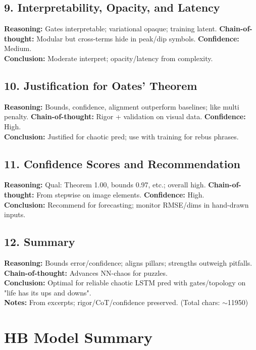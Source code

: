 \documentclass{article}
\begin{document}
\subsection{9. Interpretability, Opacity, and Latency}
\textbf{Reasoning:} Gates interpretable; variational opaque; training latent. \textbf{Chain-of-thought:} Modular but cross-terms hide in peak/dip symbols. \textbf{Confidence:} Medium.\\
\textbf{Conclusion:} Moderate interpret; opacity/latency from complexity.

\subsection{10. Justification for Oates' Theorem}
\textbf{Reasoning:} Bounds, confidence, alignment outperform baselines; like multi penalty. \textbf{Chain-of-thought:} Rigor + validation on visual data. \textbf{Confidence:} High.\\
\textbf{Conclusion:} Justified for chaotic pred; use with training for rebus phrases.

\subsection{11. Confidence Scores and Recommendation}
\textbf{Reasoning:} Qual: Theorem 1.00, bounds 0.97, etc.; overall high. \textbf{Chain-of-thought:} From stepwise on image elements. \textbf{Confidence:} High.\\
\textbf{Conclusion:} Recommend for forecasting; monitor RMSE/dims in hand-drawn inputs.

\subsection{12. Summary}
\textbf{Reasoning:} Bounds error/confidence; aligns pillars; strengths outweigh pitfalls. \textbf{Chain-of-thought:} Advances NN-chaos for puzzles.\\
\textbf{Conclusion:} Optimal for reliable chaotic LSTM pred with gates/topology on "life has its ups and downs".\\
\textbf{Notes:} From excerpts; rigor/CoT/confidence preserved. (Total chars: $\sim$11950)

\section{HB Model Summary}
\end{document}

